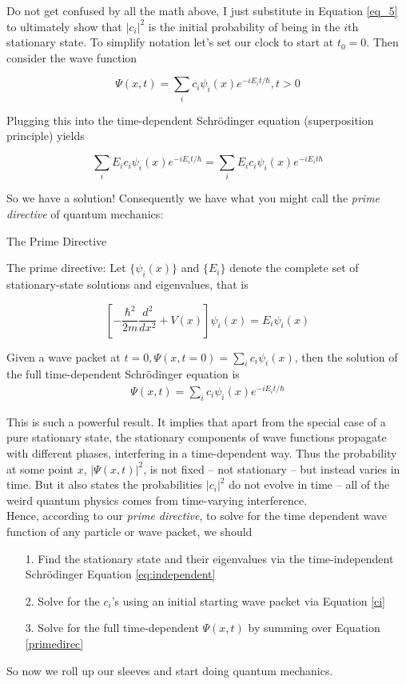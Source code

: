 Do not get confused by all the math above, I just substitute in Equation
\ref{eq_5} to ultimately show that $|c_i|^2$ is the initial probability of
being in the $i$th stationary state. To simplify notation let's set our clock
to start at $t_0 = 0$. Then consider the wave function 

\[ \Psi(x, t) = \sum_i c_i \psi_i(x) e^{-iE_i t/\hbar}, t > 0 \] 


Plugging this into the time-dependent Schr\"odinger equation (superposition
principle) yields 

\[
  \sum_i E_i c_i \psi_i(x) e^{-iE_i t/\hbar} = \sum_i E_i c_i \psi_i(x)
  e^{-iE_i t\hbar}
\] \vspace{3px}

So we have a solution! Consequently we have what you might call the
\textit{prime directive} of quantum mechanics: 

\begin{subbox}{The Prime Directive}
  
    The prime directive: Let $\{\psi_i(x)\}$ and $\{E_i\}$ denote the
    complete set of stationary-state solutions and eigenvalues, that is 

    \[
    \left[ -\frac{\hbar^2}{2m} \frac{d^2 }{d x^2} + V(x) \right] \psi_i(x)
    = E_i \psi_i(x) 
  \] \vspace{3px}

  Given a wave packet at $t=0, \Psi(x, t = 0) = \sum_i c_i \psi_i(x)$,
    then the solution of the full time-dependent Schr\"odinger equation is
    \begin{align}\label{primedirec}
    \Psi(x, t) = \sum_i c_i \psi_i(x) e^{-iE_i t/\hbar}
  \end{align}
\end{subbox}

This is such a powerful result. It implies that apart from the special case of a pure stationary state,
the stationary components of wave functions propagate with different phases,
interfering in a time-dependent way. Thus the probability at some point $x$,
$|\Psi(x, t)|^2$, is not fixed -- not stationary --
but instead varies in time. But it also states the probabilities $|c_i|^2$ do
not evolve in time -- all of the weird quantum physics comes from time-varying interference.\\

Hence, according to our \textit{prime directive}, to solve for the time
dependent wave function of any particle or wave packet, we should 

\begin{itemize}
  \item[1.] Find the stationary state and their eigenvalues via the
    time-independent Schr\"odinger Equation \ref{eq:independent}
  \item[2.] Solve for the $c_i$'s using an initial starting wave packet via
    Equation \ref{ci}
  \item[3.] Solve for the full time-dependent $\Psi(x, t)$ by summing over
    Equation \ref{primedirec}
\end{itemize} 

So now we roll up our sleeves and start doing quantum mechanics. 
